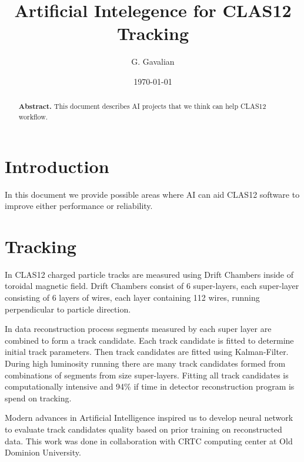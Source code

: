 \documentclass[11pt]{revtex4}
\begin{document}
\title{ Artificial Intelegence for CLAS12 Tracking}


\author{G. Gavalian}
%

\date{\today}

\begin{abstract}
{{\bf Abstract.}
This document describes AI projects that we think can help CLAS12 workflow.
}
\end{abstract}
\maketitle

\vspace{1in}

\section{Introduction}

In this document we provide possible areas where AI can aid CLAS12 software
to improve either performance or reliability.

\section{Tracking}

In CLAS12 charged particle tracks are measured using Drift Chambers inside of
toroidal magnetic field. Drift Chambers consist of 6 super-layers, each super-layer
 consisting of 6 layers of wires, each layer containing 112 wires, running perpendicular
 to particle direction.

In data reconstruction process segments measured by each super layer are combined
to form a track candidate. Each track candidate is fitted to determine initial
track parameters. Then track candidates are fitted using Kalman-Filter.
During high luminosity running there are many track candidates formed from
combinations of segments from size super-layers. Fitting all track candidates
is computationally intensive and 94\% if time in detector reconstruction program
is spend on tracking.

Modern advances in Artificial Intelligence inspired us to develop neural network
to evaluate track candidates quality based on prior training on reconstructed data.
This work was done in collaboration with CRTC computing center at Old Dominion University.
\end{document}
